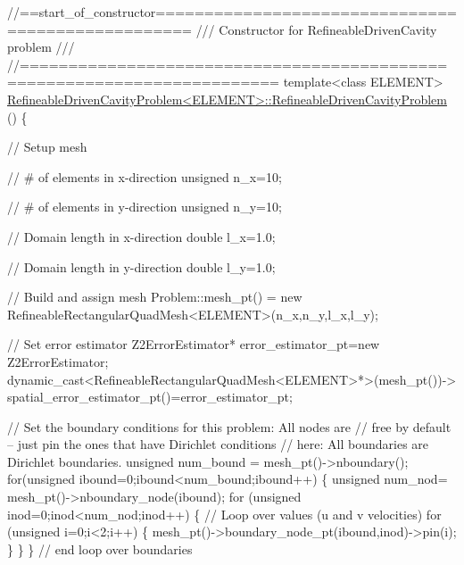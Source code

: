 \begin{DoxyCodeInclude}
\textcolor{comment}{//==start\_of\_constructor==================================================}
\textcolor{comment}{/// Constructor for RefineableDrivenCavity problem }
\textcolor{comment}{}\textcolor{comment}{///}
\textcolor{comment}{}\textcolor{comment}{//========================================================================}
\textcolor{keyword}{template}<\textcolor{keyword}{class} ELEMENT>
\hyperlink{classRefineableDrivenCavityProblem_aef71ddbff081a1f9c7f5484a6c80598a}{RefineableDrivenCavityProblem<ELEMENT>::RefineableDrivenCavityProblem}
      ()
\{ 

 \textcolor{comment}{// Setup mesh}

 \textcolor{comment}{// # of elements in x-direction}
 \textcolor{keywordtype}{unsigned} n\_x=10;

 \textcolor{comment}{// # of elements in y-direction}
 \textcolor{keywordtype}{unsigned} n\_y=10;

 \textcolor{comment}{// Domain length in x-direction}
 \textcolor{keywordtype}{double} l\_x=1.0;

 \textcolor{comment}{// Domain length in y-direction}
 \textcolor{keywordtype}{double} l\_y=1.0;

 \textcolor{comment}{// Build and assign mesh}
 Problem::mesh\_pt() = 
  \textcolor{keyword}{new} RefineableRectangularQuadMesh<ELEMENT>(n\_x,n\_y,l\_x,l\_y);

 \textcolor{comment}{// Set error estimator}
 Z2ErrorEstimator* error\_estimator\_pt=\textcolor{keyword}{new} Z2ErrorEstimator;
 \textcolor{keyword}{dynamic\_cast<}RefineableRectangularQuadMesh<ELEMENT>*\textcolor{keyword}{>}(mesh\_pt())->
  spatial\_error\_estimator\_pt()=error\_estimator\_pt;
 
 \textcolor{comment}{// Set the boundary conditions for this problem: All nodes are}
 \textcolor{comment}{// free by default -- just pin the ones that have Dirichlet conditions}
 \textcolor{comment}{// here: All boundaries are Dirichlet boundaries.}
 \textcolor{keywordtype}{unsigned} num\_bound = mesh\_pt()->nboundary();
 \textcolor{keywordflow}{for}(\textcolor{keywordtype}{unsigned} ibound=0;ibound<num\_bound;ibound++)
  \{
   \textcolor{keywordtype}{unsigned} num\_nod= mesh\_pt()->nboundary\_node(ibound);
   \textcolor{keywordflow}{for} (\textcolor{keywordtype}{unsigned} inod=0;inod<num\_nod;inod++)
    \{
     \textcolor{comment}{// Loop over values (u and v velocities)}
     \textcolor{keywordflow}{for} (\textcolor{keywordtype}{unsigned} i=0;i<2;i++)
      \{
       mesh\_pt()->boundary\_node\_pt(ibound,inod)->pin(i); 
      \}
    \}
  \} \textcolor{comment}{// end loop over boundaries}


\end{DoxyCodeInclude}
